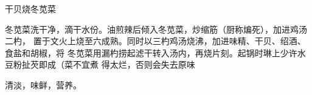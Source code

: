\begin{recipe}{干贝烧冬苋菜}

\ingredients


\preparation

冬苋菜洗干净，滴干水份。油煎辣后倾入冬苋菜，炒缩筋（厨称煸死），加进鸡汤二杓，
置于文火上烧至六成熟。同时以三杓鸡汤烧沸，加进味精、干贝、绍酒、食盐和胡椒，将
冬苋菜用漏杓捞起滤干转入汤内，再烧片刻。起锅时琳上少许水豆粉扯芡即成（菜不宜煮
得太烂，否则会失去原味

\features

清淡，味鲜，营养。

\end{recipe}

